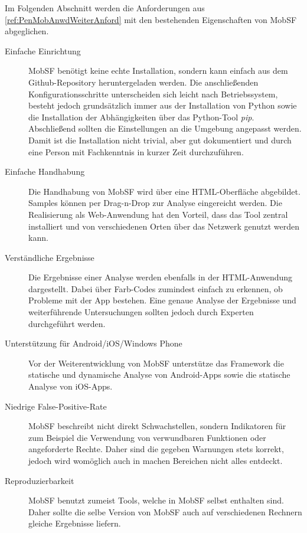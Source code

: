 Im Folgenden Abschnitt werden die Anforderungen aus \ref{ref:PenMobAnwdWeiterAnford} mit den bestehenden Eigenschaften von MobSF abgeglichen.

\begin{description}
	\item[Einfache Einrichtung] MobSF benötigt keine echte Installation, sondern kann einfach aus dem Github-Repository heruntergeladen werden. Die anschließenden Konfigurationsschritte unterscheiden sich leicht nach Betriebssystem, besteht jedoch grundsätzlich immer aus der Installation von Python sowie die Installation der Abhängigkeiten über das Python-Tool \textit{pip}. Abschließend sollten die Einstellungen an die Umgebung angepasst werden. Damit ist die Installation nicht trivial, aber gut dokumentiert und durch eine Person mit Fachkenntnis in kurzer Zeit durchzuführen.
	
	\item[Einfache Handhabung] Die Handhabung von MobSF wird über eine HTML-Oberfläche abgebildet. Samples können per Drag-n-Drop zur Analyse eingereicht werden. Die Realisierung als Web-Anwendung hat den Vorteil, dass das Tool zentral installiert und von verschiedenen Orten über das Netzwerk genutzt werden kann.
	
	\item[Verständliche Ergebnisse] Die Ergebnisse einer Analyse werden ebenfalls in der HTML-Anwendung dargestellt. Dabei über Farb-Codes zumindest einfach zu erkennen, ob Probleme mit der App bestehen. Eine genaue Analyse der Ergebnisse und weiterführende Untersuchungen sollten jedoch durch Experten durchgeführt werden.
	
	\item[Unterstützung für Android/iOS/Windows Phone] Vor der Weiterentwicklung von MobSF unterstütze das Framework die statische und dynamische Analyse von Android-Apps sowie die statische Analyse von iOS-Apps.
	
	\item[Niedrige False-Positive-Rate] MobSF beschreibt nicht direkt Schwachstellen, sondern Indikatoren für zum Beispiel die Verwendung von verwundbaren Funktionen oder angeforderte Rechte. Daher sind die gegeben Warnungen stets korrekt, jedoch wird womöglich auch in machen Bereichen nicht alles entdeckt.
	
	\item[Reproduzierbarkeit] MobSF benutzt zumeist Tools, welche in MobSF selbst enthalten sind. Daher sollte die selbe Version von MobSF auch auf verschiedenen Rechnern gleiche Ergebnisse liefern.
	
\end{description}

